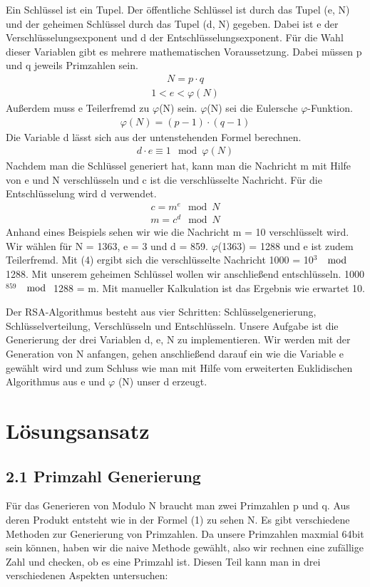 \documentclass[course=asp]{aspdoc}
\begin{document}
Ein Schlüssel ist ein Tupel. Der öffentliche Schlüssel ist durch das Tupel (e, N) und der geheimen Schlüssel durch das Tupel (d, N) gegeben. Dabei ist e der Verschlüsselungsexponent und d der Entschlüsselungsexponent. Für die Wahl dieser Variablen gibt es mehrere mathematischen Voraussetzung. Dabei müssen p und q jeweils Primzahlen sein.
\begin{align}
 N = p \cdot q
\end{align}
\begin{align}
1 < e < \varphi (N)
\end{align}
Außerdem muss e Teilerfremd zu $\varphi $(N) sein. $\varphi $(N) sei die Eulersche $\varphi $-Funktion.
\begin{align}
\varphi (N) = (p - 1)\cdot(q - 1)
\end{align}
Die Variable d lässt sich aus der untenstehenden Formel berechnen.
\begin{align}
d \cdot e \equiv 1 \mod \varphi (N)
\end{align}
Nachdem man die Schlüssel generiert hat, kann man die Nachricht m mit Hilfe von e und N verschlüsseln und c ist die verschlüsselte Nachricht. Für die Entschlüsselung wird d verwendet.
\begin{align}
c {=} m^e \mod N
\end{align} 
\begin{align}
m {=} c^d \mod N
\end{align} 
Anhand eines Beispiels sehen wir wie die Nachricht m = 10 verschlüsselt wird. Wir wählen für N = 1363, e = 3 und d = 859. $\varphi $(1363) = 1288 und e ist zudem Teilerfremd. Mit (4) ergibt sich die verschlüsselte Nachricht 1000 = 10$^{3}$ $\mod $ 1288. Mit unserem geheimen Schlüssel wollen wir anschließend entschlüsseln. 1000$^{859}$ $\mod $ 1288 = m. Mit manueller Kalkulation ist das Ergebnis wie erwartet 10.

Der RSA-Algorithmus besteht aus vier Schritten: Schlüsselgenerierung, Schlüsselverteilung, Verschlüsseln und Entschlüsseln. Unsere Aufgabe ist die Generierung der drei Variablen d, e, N zu implementieren. Wir werden mit der Generation von N anfangen, gehen anschließend darauf ein wie die Variable e gewählt wird und zum Schluss wie man mit Hilfe vom erweiterten Euklidischen Algorithmus aus e und $\varphi $ (N) unser d erzeugt.

\section{Lösungsansatz}  
\subsection*{2.1 Primzahl Generierung }
Für das Generieren von Modulo N braucht man zwei Primzahlen p und q. Aus deren Produkt entsteht wie in der Formel (1) zu sehen N. Es gibt verschiedene Methoden zur Generierung von Primzahlen. Da unsere Primzahlen maxmial 64bit sein können, haben wir die naive Methode gewählt, also wir rechnen eine zufällige Zahl und checken, ob es eine Primzahl ist. Diesen Teil kann man in drei verschiedenen Aspekten untersuchen:
\end{document}
